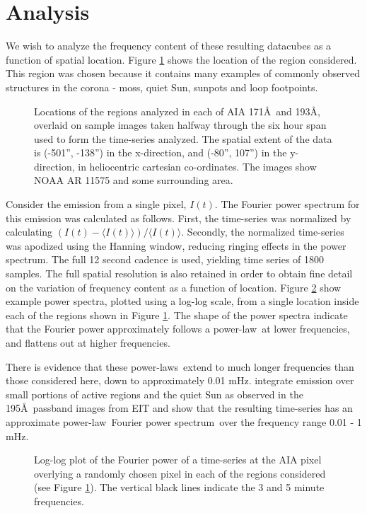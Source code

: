 \documentclass[onecolumn]{emulateapj}
\newcommand{\PS}{power spectrum}
\newcommand{\PL}{power-law}
\newcommand{\PLs}{power-laws}
\newcommand{\Fps}{Fourier \PS}
\begin{document}
\section{Analysis}\label{sec:anal}
We wish to analyze the frequency content of these resulting datacubes
as a function of spatial location.  Figure \ref{fig:loc171193} shows
the location of the region considered. This region was chosen because
it contains many examples of commonly observed structures in the
corona - moss, quiet Sun, sunpots and loop footpoints.
\begin{figure}
\centerline{
}
\caption{Locations of the regions analyzed in each of AIA 171\AA\ and
  193\AA, overlaid on sample images taken halfway through the six hour
  span used to form the time-series analyzed.  The spatial extent of
  the data is (-501'', -138'') in the x-direction, and (-80'', 107'')
  in the y-direction, in heliocentric cartesian co-ordinates.  The
  images show NOAA AR 11575 and some surrounding area.}
\label{fig:loc171193}
\end{figure}

Consider the emission from a single pixel, $I(t)$.  The Fourier power
spectrum for this emission was calculated as follows.  First, the
time-series was normalized by calculating $(I(t) - \langle I(t)
\rangle)/\langle I(t) \rangle$. Secondly, the normalized time-series
was apodized using the Hanning window, reducing ringing effects in the
\PS.  The full 12 second cadence is used, yielding time series of 1800
samples.  The full spatial resolution is also retained in order to
obtain fine detail on the variation of frequency content as a function
of location.  Figure \ref{fig:compare171193} show example power
spectra, plotted using a log-log scale, from a single location inside
each of the regions shown in Figure \ref{fig:loc171193}.  The shape of
the power spectra indicate that the Fourier power approximately
follows a \PL\ at lower frequencies, and flattens out at higher
frequencies.

There is evidence that these \PLs\ extend to much longer
frequencies than those considered here, down to approximately 0.01
mHz. \cite{2014AA...563A...8A} integrate emission over small portions
of active regions and the quiet Sun as observed in the 195\AA\ passband
images from EIT and show that the resulting time-series has an
approximate \PL\ \Fps\ over the frequency range 0.01 - 1 mHz.

\begin{figure}
\centerline{
}
\centerline{
}
\caption{Log-log plot of the Fourier power of a time-series at the AIA
  pixel overlying a randomly chosen pixel in each of the regions
  considered (see Figure \protect\ref{fig:loc171193}).  The vertical
  black lines indicate the 3 and 5 minute frequencies.}
\label{fig:compare171193}
\end{figure}
\end{document}
